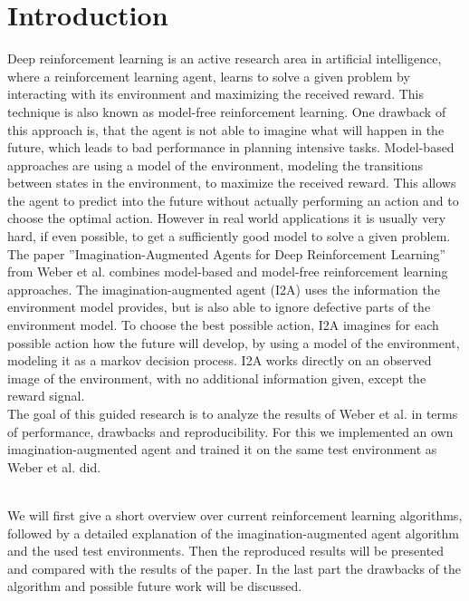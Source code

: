 \section{Introduction}

Deep reinforcement learning is an active research area in artificial intelligence, where a reinforcement learning agent, learns to solve a given problem by interacting with its environment and maximizing the received reward.
This technique is also known as model-free reinforcement learning. 
One drawback of this approach is, that the agent is not able to imagine what will happen in the future, which leads to bad performance in planning intensive tasks.
Model-based approaches are using a model of the environment,  modeling the transitions between states in the environment, to maximize the received reward. This allows the agent to predict into the future without actually performing an action and to choose the optimal action.
However in real world applications it is usually very hard, if even possible, to get a sufficiently good model to solve a given problem.\\

The paper ”Imagination-Augmented Agents for Deep Reinforcement Learning” from Weber et al. \cite{I2A} combines model-based and model-free reinforcement learning approaches.
The imagination-augmented agent (I2A) uses the information the environment model provides, but is also able to ignore defective parts of the environment model. 
To choose the best possible action, I2A imagines for each possible action how the future will develop, by using a model of the environment, modeling it as a markov decision process. 
I2A works directly on an observed image of the environment, with no additional information given, except the reward signal.\\

The goal of this guided research is to analyze the results of Weber et al. in terms of performance, drawbacks and reproducibility.
For this we implemented an own imagination-augmented agent and trained it on the same test environment as Weber et al. did.\\\

We will first give a short overview over current reinforcement learning algorithms, followed by a detailed explanation of the imagination-augmented agent algorithm and the used test environments. Then the reproduced results will be presented and compared with the results of the paper. In the last part the drawbacks of the algorithm and possible future work will be discussed.


